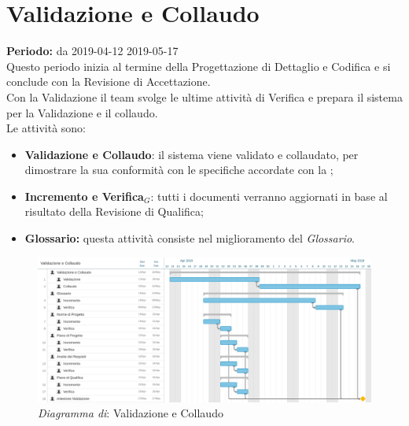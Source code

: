 \section{Validazione e Collaudo}
\textbf{Periodo:} da 2019-04-12 2019-05-17\\
Questo periodo inizia al termine della Progettazione di Dettaglio e Codifica e si conclude con la Revisione di Accettazione.\\Con la Validazione il team svolge le ultime attività di Verifica e prepara il sistema per la Validazione e il collaudo.\\
Le attività sono:
\begin{itemize}
    \item \textbf{Validazione e Collaudo}: il sistema viene validato e collaudato, per dimostrare la sua conformità con le specifiche accordate con la  ;
    \item \textbf{Incremento e Verifica$_{G}$}: tutti i documenti verranno aggiornati in base al risultato della Revisione di Qualifica;
    \item \textbf{Glossario:} questa attività consiste nel miglioramento del \textit{Glossario}.
\end{itemize}
\begin{figure} [h]
    \centering
    \includegraphics[scale=0.1]{./images/validazione_collaudo.jpg}
    \caption{\textit{Diagramma di}: Validazione e Collaudo }\label{}
\end{figure}